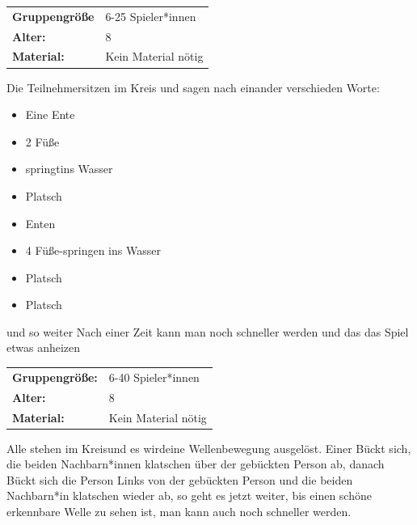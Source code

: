 \newpage
\begin{table}[H]
	\begin{tabular}{>{\bfseries}lp{8cm}}
		Gruppengröße   & 6-25 Spieler*innen\\
		Alter: & 8 \\
		Material: & Kein Material nötig \\
	\end{tabular}
\end{table}
 Die Teilnehmersitzen im Kreis und sagen nach einander verschieden Worte:
    \begin{itemize}
        \item Eine Ente
        \item 2 Füße
        \item springtins Wasser
        \item Platsch
        \item Enten
        \item 4 Füße-springen ins Wasser
        \item Platsch
        \item Platsch
    \end{itemize} 
    und so weiter Nach einer Zeit kann man noch schneller werden und das das Spiel etwas anheizen\\



\begin{table}[H]
\begin{tabular}{>{\bfseries}lp{8cm}}
   Gruppengröße:   & 6-40 Spieler*innen\\
    Alter: & 8 \\
    Material: & Kein Material nötig\\
\end{tabular}
\end{table} 
Alle stehen im Kreisund es wirdeine Wellenbewegung ausgelöst. Einer Bückt sich, die beiden Nachbarn*innen klatschen über der gebückten Person ab, danach Bückt sich die Person Links von der gebückten Person und die beiden Nachbarn*in klatschen wieder ab, so geht es jetzt weiter, bis einen schöne erkennbare Welle zu sehen ist, man kann auch noch schneller werden. 
\\



